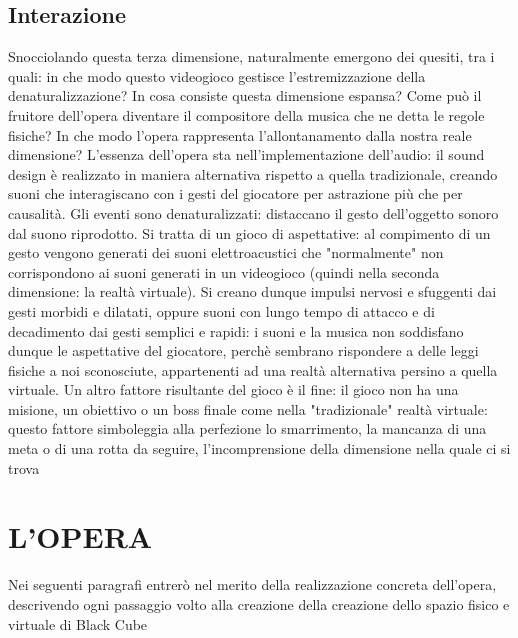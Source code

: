 	\subsection{Interazione}
	Snocciolando questa terza dimensione, naturalmente emergono dei quesiti, tra i quali: in che modo questo videogioco gestisce l'estremizzazione della denaturalizzazione? In cosa consiste questa dimensione espansa? Come può il fruitore dell'opera diventare il compositore della musica che ne detta le regole fisiche? In che modo  l'opera rappresenta l'allontanamento dalla nostra reale dimensione?
	L'essenza dell'opera sta nell'implementazione dell'audio: il sound design è realizzato in maniera alternativa rispetto a quella tradizionale, creando suoni che interagiscano con i gesti del giocatore per astrazione più che per causalità. Gli eventi sono denaturalizzati: distaccano il gesto dell'oggetto sonoro dal suono riprodotto.
	Si tratta di un gioco di aspettative: al compimento di un gesto vengono generati dei suoni elettroacustici che "normalmente" non corrispondono ai suoni generati in un videogioco (quindi nella seconda dimensione: la realtà virtuale). Si creano dunque impulsi nervosi e sfuggenti dai gesti morbidi e dilatati, oppure suoni con lungo tempo di attacco e di decadimento dai gesti semplici e rapidi: i suoni e la musica non soddisfano dunque le aspettative del giocatore, perchè sembrano rispondere a delle leggi fisiche a noi sconosciute, appartenenti ad una realtà alternativa persino a quella virtuale.
	Un altro fattore risultante del gioco è il fine: il gioco non ha una misione, un obiettivo o un boss finale come nella "tradizionale" realtà virtuale: questo fattore simboleggia alla perfezione lo smarrimento, la mancanza di una meta o di una rotta da seguire, l'incomprensione della dimensione nella quale ci si trova

\section{L'OPERA}
Nei seguenti paragrafi entrerò nel merito della realizzazione concreta dell'opera, descrivendo ogni passaggio volto alla creazione della creazione dello spazio fisico e virtuale di Black Cube

